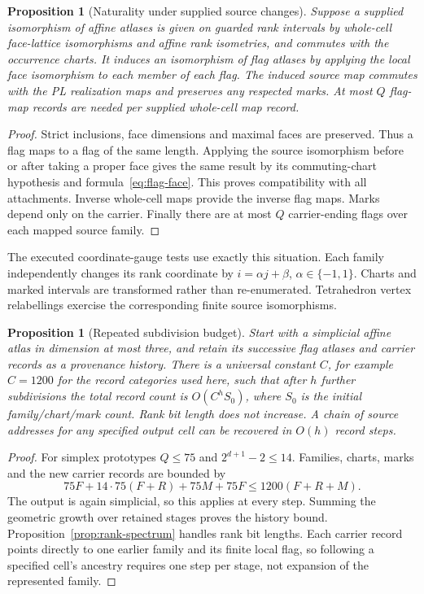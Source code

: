 \documentclass[11pt]{article}
\newtheorem{proposition}[theorem]{Proposition}
\theoremstyle{definition}\newtheorem{definition}[theorem]{Definition}
\theoremstyle{remark}\newtheorem{remark}[theorem]{Remark}
\begin{document}
\begin{proposition}[Naturality under supplied source changes]\label{prop:naturality}
Suppose a supplied isomorphism of affine atlases is given on guarded rank intervals by whole-cell face-lattice isomorphisms and affine rank isometries, and commutes with the occurrence charts. It induces an isomorphism of flag atlases by applying the local face isomorphism to each member of each flag. The induced source map commutes with the PL realization maps and preserves any respected marks. At most \(Q\) flag-map records are needed per supplied whole-cell map record.
\end{proposition}
\begin{proof}
Strict inclusions, face dimensions and maximal faces are preserved. Thus a flag maps to a flag of the same length. Applying the source isomorphism before or after taking a proper face gives the same result by its commuting-chart hypothesis and formula~\eqref{eq:flag-face}. This proves compatibility with all attachments. Inverse whole-cell maps provide the inverse flag maps. Marks depend only on the carrier. Finally there are at most \(Q\) carrier-ending flags over each mapped source family.
\end{proof}

The executed coordinate-gauge tests use exactly this situation. Each family independently changes its rank coordinate by \(i=\alpha j+\beta\), \(\alpha\in\{-1,1\}\). Charts and marked intervals are transformed rather than re-enumerated. Tetrahedron vertex relabellings exercise the corresponding finite source isomorphisms.

\begin{proposition}[Repeated subdivision budget]\label{prop:history}
Start with a simplicial affine atlas in dimension at most three, and retain its successive flag atlases and carrier records as a provenance history. There is a universal constant \(C\), for example \(C=1200\) for the record categories used here, such that after \(h\) further subdivisions the total record count is \(O(C^hS_0)\), where \(S_0\) is the initial family/chart/mark count. Rank bit length does not increase. A chain of source addresses for any specified output cell can be recovered in \(O(h)\) record steps.
\end{proposition}
\begin{proof}
For simplex prototypes \(Q\leq75\) and \(2^{d+1}-2\leq14\). Families, charts, marks and the new carrier records are bounded by
\[
  75F+14\cdot75(F+R)+75M+75F
       \leq1200(F+R+M).
\]
The output is again simplicial, so this applies at every step. Summing the geometric growth over retained stages proves the history bound. Proposition~\ref{prop:rank-spectrum} handles rank bit lengths. Each carrier record points directly to one earlier family and its finite local flag, so following a specified cell's ancestry requires one step per stage, not expansion of the represented family.
\end{proof}
\end{document}

